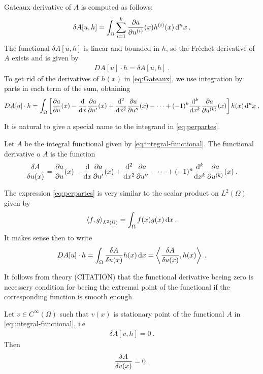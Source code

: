 Gateaux derivative of $A$ is computed as follows:
\begin{align}
    \delta A[u,h] = \int_\Omega \sum_{i=1}^k \frac{\partial a}{\partial u^{(i)}}(x) h^{(i)}(x) \, \mathrm{d}^n x \:. \label{eq:Gateaux}
\end{align}
The functional $\delta A[u,h]$ is linear and bounded in $h$, so the Fréchet derivative of $A$ exists and is given by
\begin{align}
    DA[u] \cdot h = \delta A[u,h] \:.
\end{align}
To get rid of the derivatives of $h(x)$ in \eqref{eq:Gateaux}, we use integration by parts in each term of the sum, obtaining
\begin{align}
    DA[u] \cdot h = \int_\Omega \left[ \frac{\partial a}{\partial u}(x) - \frac{\mathrm{d}}{\mathrm{d}x} \frac{\partial a}{\partial u'}(x) + \frac{\mathrm{d}^2}{\mathrm{d}x^2} \frac{\partial a}{\partial u''}(x) - \cdots + (-1)^k \frac{\mathrm{d}^k}{\mathrm{d}x^k} \frac{\partial a}{\partial u^{(k)}}(x) \right] h(x) \, \mathrm{d}^n x \:. \label{eq:perpartes}
\end{align}

It is natural to give a special name to the integrand in \eqref{eq:perpartes}.

\begin{definition}
    Let $A$ be the integral functional given by \eqref{eq:integral-functional}. The functional derivative o $A$ is the function
    \begin{align}
        \frac{\delta A}{\delta u(x)} = \frac{\partial a}{\partial u}(x) - \frac{\mathrm{d}}{\mathrm{d}x} \frac{\partial a}{\partial u'}(x) + \frac{\mathrm{d}^2}{\mathrm{d}x^2} \frac{\partial a}{\partial u''} - \cdots + (-1)^n \frac{\mathrm{d}^k}{\mathrm{d}x^k} \frac{\partial a}{\partial u^{(k)}}(x) \:.
    \end{align}
\end{definition}

The expression \eqref{eq:perpartes} is very similar to the scalar product on $L^2(\Omega)$ given by
\begin{align}
    \left \langle f ,g \right \rangle_{L^2(\Omega)} = \int_\Omega f(x) g(x) \, \mathrm{d} x \:.
\end{align}
It makes sense then to write
\begin{align}
    DA[u] \cdot h = \int_\Omega \frac{\delta A}{\delta u(x)} h(x) \, \mathrm{d} x = \left \langle \frac{\delta A}{\delta u(x)} ,h(x) \right \rangle \:.
\end{align}



It follows from theory (CITATION) that the functional derivative beeing zero is necessery condition for beeing the extremal point of the functional if the corresponding function is smooth enough.

\begin{theorem}
    Let $v \in C^\infty(\Omega)$ such that $v(x)$ is stationary point of the functional $A$ in \eqref{eq:integral-functional}, i.e
    \begin{align}
        \delta A[v,h] = 0 \:.
    \end{align}
    Then  
    \begin{align}
        \frac{\delta A}{\delta v(x)} = 0 \:.
    \end{align}
\end{theorem}

